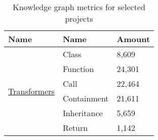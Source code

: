 \begin{table}[h]
\centering
\begin{threeparttable}
\begin{tabular}{|p{2cm}||p{2cm}|p{2cm}|}

\hline
\textbf{Name} & \textbf{Name} & \textbf{Amount} \\
\hline

\multirow{6}{*}{\href{https://github.com/huggingface/transformers}{Transformers}}   
                                & Class  & 8,609 \\ \cline{2-3}
                                & Function  & 24,301 \\ \cline{2-3}
                                & Call  & 22,464 \\ \cline{2-3}
                                & Containment  & 21,611 \\ \cline{2-3}
                                & Inheritance  & 5,659 \\ \cline{2-3}
                                & Return  & 1,142 \\ \cline{2-3}
\hline
\end{tabular}
\caption{Knowledge graph metrics for selected projects}
\label{tab:graph-metrics}
\end{threeparttable}
\end{table}
